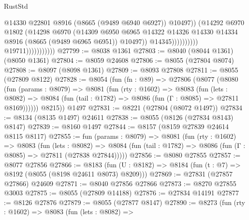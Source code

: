 \begin{lexlean}{RustStd}
\begin{coremodule}
                                                @14330
                                                @22801
                                                @8916
                                                (@8665 (@9489 @6940 @6927))
                                                @10497))
                                            (@14292
                                              @6970
                                              @1802
                                              (@14298
                                                @6970
                                                (@14309
                                                  @6950
                                                  @6965
                                                  @14322
                                                  @14326
                                                  @14330
                                                  @14334
                                                  @8916
                                                  (@8665 (@9489 @6965 @6951))
                                                  @10497))
                                              @14345))))))))))
                          @19711)))))))))))
@27799 := @8038 @1361
@27803 := @8040 (@8044 @1361) (@8050 @1361)
@27804 := @8059 @24608
@27806 := @8055 (@27804 @8074)
@27808 := @8097 (@8098 @1361)
@27809 := @8093 @27808
@27811 := @8055 (@27809 @8122)
@27828 := @8054
    (fun (fn : @89) =>
    @27806
      (@8077
        (@8080
          (fun (params : @8079) =>
          @8081
            (fun (rty : @1602) =>
            @8083
              (fun (lets : @8082) =>
              @8084 (fun (tail : @1782) => @8086 (fun (Γ : @8085) => @27811 @8169))))))
        @8215))
    @1497
@27831 := @8221 (@27804 (@8072 @1497))
@27834 := @8134 (@8135 @1497) @24611
@27838 := @8055 (@8126 (@27834 @8143) @8147)
@27839 := @8160 @1497
@27844 := @8157 (@8159 @27839 @24614 @8115 @8117)
@27855 := fun (params : @8079) =>
  @8081
    (fun (rty : @1602) =>
    @8083
      (fun (lets : @8082) =>
      @8084 (fun (tail : @1782) => @8086 (fun (Γ : @8085) => @27811 (@27838 @27844)))))
@27856 := @8080 @27855
@27857 := @8077 @27856
@27866 := @8183
    (fun (U : @8182) => @8184 (fun (t : @7) => @8192 (@8055 (@8198 @24611 @8073) @8209)))
@27869 := @27831 (@27857 @27866) @24609
@27871 := @8040 @27856 @27866
@27873 := @8270 @27855 @3003
@27875 := @8055 (@27809 @14188)
@27876 := @27834 @14191
@27877 := @8126 @27876
@27879 := @8055 (@27877 @8147)
@27890 := @8273
    (fun (rty : @1602) =>
    @8083
      (fun (lets : @8082) =>

\end{coremodule}
\end{lexlean}
